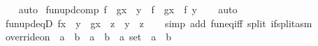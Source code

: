 \begin{isabellebody}
%
\isadelimproof
\ \ %
\endisadelimproof
%
\isatagproof
{}\isamarkupfalse%
\ auto%
\endisatagproof
{\isafoldproof}%
%
\isadelimproof
\isanewline
%
\endisadelimproof
\isanewline
{}\isamarkupfalse%
\ fun{\isacharunderscore}{\kern0pt}upd{\isacharunderscore}{\kern0pt}comp{\isacharcolon}{\kern0pt}\ {\isachardoublequoteopen}f\ {\isasymcirc}\ {\isacharparenleft}{\kern0pt}g{\isacharparenleft}{\kern0pt}x\ {\isacharcolon}{\kern0pt}{\isacharequal}{\kern0pt}\ y{\isacharparenright}{\kern0pt}{\isacharparenright}{\kern0pt}\ {\isacharequal}{\kern0pt}\ {\isacharparenleft}{\kern0pt}f\ {\isasymcirc}\ g{\isacharparenright}{\kern0pt}{\isacharparenleft}{\kern0pt}x\ {\isacharcolon}{\kern0pt}{\isacharequal}{\kern0pt}\ f\ y{\isacharparenright}{\kern0pt}{\isachardoublequoteclose}\isanewline
%
\isadelimproof
\ \ %
\endisadelimproof
%
\isatagproof
{}\isamarkupfalse%
\ auto%
\endisatagproof
{\isafoldproof}%
%
\isadelimproof
\isanewline
%
\endisadelimproof
\isanewline
{}\isamarkupfalse%
\ fun{\isacharunderscore}{\kern0pt}upd{\isacharunderscore}{\kern0pt}eqD{\isacharcolon}{\kern0pt}\ {\isachardoublequoteopen}f{\isacharparenleft}{\kern0pt}x\ {\isacharcolon}{\kern0pt}{\isacharequal}{\kern0pt}\ y{\isacharparenright}{\kern0pt}\ {\isacharequal}{\kern0pt}\ g{\isacharparenleft}{\kern0pt}x\ {\isacharcolon}{\kern0pt}{\isacharequal}{\kern0pt}\ z{\isacharparenright}{\kern0pt}\ {\isasymLongrightarrow}\ y\ {\isacharequal}{\kern0pt}\ z{\isachardoublequoteclose}\isanewline
%
\isadelimproof
\ \ %
\endisadelimproof
%
\isatagproof
{}\isamarkupfalse%
\ {\isacharparenleft}{\kern0pt}simp\ add{\isacharcolon}{\kern0pt}\ fun{\isacharunderscore}{\kern0pt}eq{\isacharunderscore}{\kern0pt}iff\ split{\isacharcolon}{\kern0pt}\ if{\isacharunderscore}{\kern0pt}split{\isacharunderscore}{\kern0pt}asm{\isacharparenright}{\kern0pt}%
\endisatagproof
{\isafoldproof}%
%
\isadelimproof
%
\endisadelimproof
%
\isadelimdocument
%
\endisadelimdocument
%
\isatagdocument
%
\isamarkuptrue%
%
\endisatagdocument
{\isafolddocument}%
%
\isadelimdocument
%
\endisadelimdocument
{}\isamarkupfalse%
\ override{\isacharunderscore}{\kern0pt}on\ {\isacharcolon}{\kern0pt}{\isacharcolon}{\kern0pt}\ {\isachardoublequoteopen}{\isacharparenleft}{\kern0pt}{\isacharprime}{\kern0pt}a\ {\isasymRightarrow}\ {\isacharprime}{\kern0pt}b{\isacharparenright}{\kern0pt}\ {\isasymRightarrow}\ {\isacharparenleft}{\kern0pt}{\isacharprime}{\kern0pt}a\ {\isasymRightarrow}\ {\isacharprime}{\kern0pt}b{\isacharparenright}{\kern0pt}\ {\isasymRightarrow}\ {\isacharprime}{\kern0pt}a\ set\ {\isasymRightarrow}\ {\isacharprime}{\kern0pt}a\ {\isasymRightarrow}\ {\isacharprime}{\kern0pt}b{\isachardoublequoteclose}\isanewline

\end{isabellebody}
